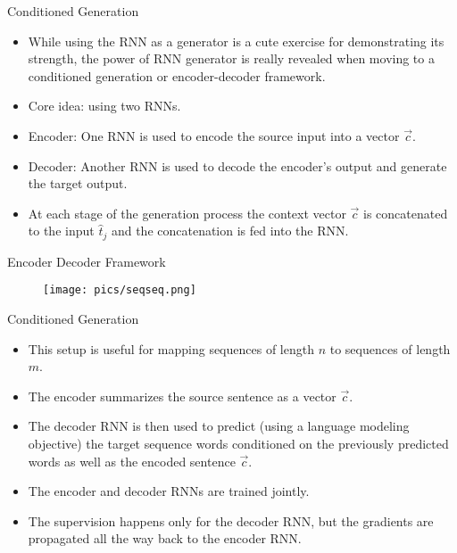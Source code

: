 \documentclass[handout]{beamer}
\begin{document}
\begin{frame}{Conditioned Generation}
\begin{scriptsize}
\begin{itemize}
\item While using the RNN as a generator is a cute exercise for demonstrating its strength, the power of RNN generator is really revealed when moving to a conditioned generation or encoder-decoder framework.
\item Core idea: using two RNNs.
\item Encoder: One RNN is used to encode the source input into a vector $\overrightarrow{c}$.
\item Decoder: Another RNN is used to decode the encoder's output and generate the target output.
\item At each stage of the generation process the context vector $\overrightarrow{c}$ is concatenated to the input $\hat{t}_j$ and the concatenation is fed into the RNN.
\end{itemize}
\end{scriptsize}
\end{frame}


\begin{frame}{Encoder Decoder Framework}
         \begin{figure}[h]
        	\texttt{[image: pics/seqseq.png]}
        \end{figure}  
\end{frame}




\begin{frame}{Conditioned Generation}
\begin{scriptsize}
\begin{itemize}
\item This setup is useful for mapping sequences of length $n$ to sequences of length $m$.
\item The encoder summarizes the source sentence as a vector $\vec{c}$.
\item The decoder RNN is then used to predict (using a language modeling objective) the target sequence words conditioned on the previously predicted words as well as the encoded sentence $\vec{c}$.
\item The encoder and decoder RNNs are trained jointly.
\item The supervision happens only for the decoder RNN, but the gradients are propagated all the way back to the encoder RNN.
\end{itemize}
\end{scriptsize}
\end{frame}
\end{document}
